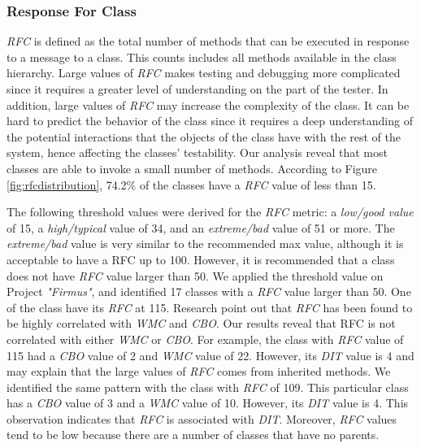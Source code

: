 \subsubsection{Response For Class}
\textit{RFC} is defined as the total number of methods that can be executed in response to a message to a class. This counts includes all methods available in the class hierarchy. Large values of \textit{RFC} makes testing and debugging more complicated since it requires a greater level of understanding on the part of the tester\cite{chidamber1994metrics}. In addition, large values of \textit{RFC} may increase the complexity of the class. It can be hard to predict the behavior of the class since it requires a deep understanding of the potential interactions that the objects of the class have with the rest of the system, hence affecting the classes' testability. Our analysis reveal that most classes are able to invoke a small number of methods. According to Figure \ref{fig:rfcdistribution}, 74.2\% of the classes have a \textit{RFC} value of less than 15.

The following threshold values were derived for the \textit{RFC} metric: a \textit{low/good value} of 15, a \textit{high/typical} value of 34, and an \textit{extreme/bad} value of 51 or more. The \textit{extreme/bad} value is very similar to the recommended max value, although it is acceptable to have a RFC up to 100\cite{metricoverview}. However, it is recommended that a class does not have \textit{RFC} value larger than 50. We applied the threshold value on Project \textit{"Firmus"}, and identified 17 classes with a \textit{RFC} value larger than 50. One of the class have its \textit{RFC} at 115. Research point out that \textit{RFC} has been found to be highly correlated with \textit{WMC} and \textit{CBO}\cite{chidamber1994metrics}. Our results reveal that RFC is not correlated with either \textit{WMC} or \textit{CBO}. For example, the class with \textit{RFC} value of 115 had a \textit{CBO} value of 2 and \textit{WMC} value of 22. However, its \textit{DIT} value is 4 and may explain that the large values of \textit{RFC} comes from inherited methods. We identified the same pattern with the class with \textit{RFC} of 109. This particular class has a \textit{CBO} value of 3 and a \textit{WMC} value of 10. However, its \textit{DIT} value is 4. This observation indicates that \textit{RFC} is associated with \textit{DIT}. Moreover, \textit{RFC} values tend to be low because there are a number of classes that have no parents.


